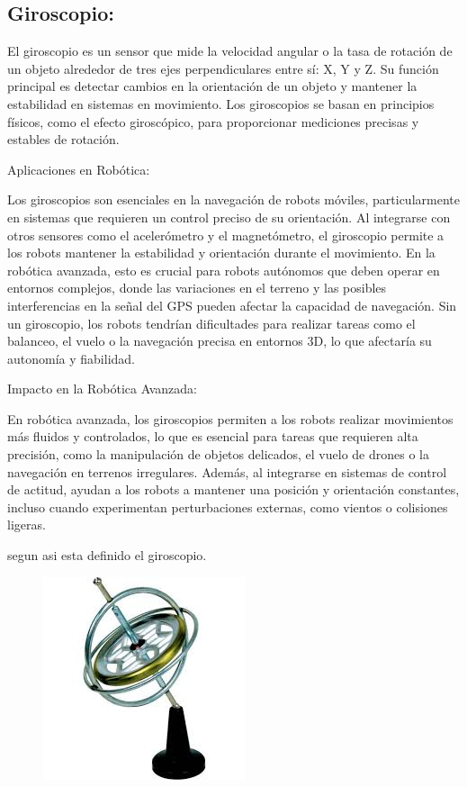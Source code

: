 \subsection{\textbf{Giroscopio}:}	
El giroscopio es un sensor que mide la velocidad angular o la tasa de rotación de un objeto alrededor de tres ejes perpendiculares entre sí: X, Y y Z. Su función principal es detectar cambios en la orientación de un objeto y mantener la estabilidad en sistemas en movimiento. Los giroscopios se basan en principios físicos, como el efecto giroscópico, para proporcionar mediciones precisas y estables de rotación.


Aplicaciones en Robótica:


Los giroscopios son esenciales en la navegación de robots móviles, particularmente en sistemas que requieren un control preciso de su orientación. Al integrarse con otros sensores como el acelerómetro y el magnetómetro, el giroscopio permite a los robots mantener la estabilidad y orientación durante el movimiento. En la robótica avanzada, esto es crucial para robots autónomos que deben operar en entornos complejos, donde las variaciones en el terreno y las posibles interferencias en la señal del GPS pueden afectar la capacidad de navegación. Sin un giroscopio, los robots tendrían dificultades para realizar tareas como el balanceo, el vuelo o la navegación precisa en entornos 3D, lo que afectaría su autonomía y fiabilidad.


Impacto en la Robótica Avanzada:


En robótica avanzada, los giroscopios permiten a los robots realizar movimientos más fluidos y controlados, lo que es esencial para tareas que requieren alta precisión, como la manipulación de objetos delicados, el vuelo de drones o la navegación en terrenos irregulares. Además, al integrarse en sistemas de control de actitud, ayudan a los robots a mantener una posición y orientación constantes, incluso cuando experimentan perturbaciones externas, como vientos o colisiones ligeras.

segun \cite{grewal2014kalman} asi esta definido el giroscopio.

\begin{figure} [h]
	\centering
	\includegraphics[width=0.2\linewidth]{img/giroscopio}
	\caption{}
	\label{fig:giroscopio}
\end{figure}

